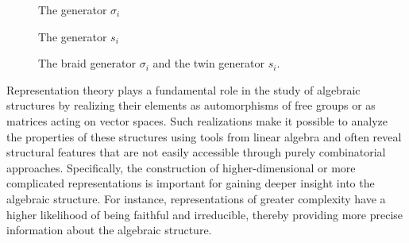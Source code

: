 \documentclass[reqno]{amsart}
\begin{document}
\begin{figure}[h!] 
\centering
\begin{minipage}{0.45\textwidth}
\centering
{}

\vspace{0.1cm}
{\small The generator $\sigma_i$}
\end{minipage}
\hfill
\begin{minipage}{0.45\textwidth}
\centering
{}

\vspace{0.1cm}
{\small The generator $s_i$}
\end{minipage}
\caption{The braid generator $\sigma_i$ and the twin generator $s_i$.}
\label{Fig1}
\end{figure}

Representation theory plays a fundamental role in the study of algebraic structures by realizing their elements as automorphisms of free groups or as matrices acting on vector spaces. Such realizations make it possible to analyze the properties of these structures using tools from linear algebra and often reveal structural features that are not easily accessible through purely combinatorial approaches. Specifically, the construction of higher-dimensional or more complicated representations is important for gaining deeper insight into the algebraic structure. For instance, representations of greater complexity have a higher likelihood of being faithful and irreducible, thereby providing more precise information about the algebraic structure. \vspace*{0.15cm}
\end{document}
